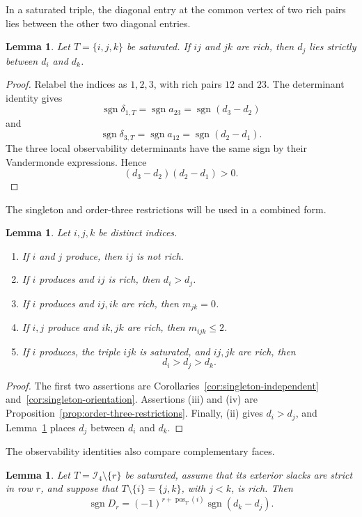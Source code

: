 \documentclass[11pt,a4paper]{article}
\newtheorem{lemma}[theorem]{Lemma}
\theoremstyle{definition}
\newcommand{\Ind}{\mathcal I}
\DeclareMathOperator{\sgn}{sgn}
\begin{document}
In a saturated triple, the diagonal entry at the common vertex of two
rich pairs lies between the other two diagonal entries.

\begin{lemma}
\label{lem:rich-path-median}
Let $T=\{i,j,k\}$ be saturated. If $ij$ and $jk$ are rich, then $d_j$
lies strictly between $d_i$ and $d_k$.
\end{lemma}

\begin{proof}
Relabel the indices as $1,2,3$, with rich pairs $12$ and $23$. The
determinant identity gives
$$
\sgn\delta_{1,T}
=
\sgn a_{23}
=
\sgn(d_3-d_2)
$$
and
$$
\sgn\delta_{3,T}
=
\sgn a_{12}
=
\sgn(d_2-d_1).
$$
The three local observability determinants have the same sign by their
Vandermonde expressions. Hence
$$
(d_3-d_2)(d_2-d_1)>0.
$$
\end{proof}

The singleton and order-three restrictions will be used in a combined
form.

\begin{lemma}
\label{lem:singleton-rich-rules}
Let $i,j,k$ be distinct indices.

\begin{enumerate}[label=\textup{(\roman*)}]
\item If $i$ and $j$ produce, then $ij$ is not rich.
\item If $i$ produces and $ij$ is rich, then $d_i>d_j$.
\item If $i$ produces and $ij,ik$ are rich, then $m_{jk}=0$.
\item If $i,j$ produce and $ik,jk$ are rich, then $m_{ijk}\leq2$.
\item If $i$ produces, the triple $ijk$ is saturated, and $ij,jk$ are
rich, then
$$
d_i>d_j>d_k.
$$
\end{enumerate}
\end{lemma}

\begin{proof}
The first two assertions are
Corollaries~\ref{cor:singleton-independent}
and~\ref{cor:singleton-orientation}. Assertions \textup{(iii)} and
\textup{(iv)} are Proposition~\ref{prop:order-three-restrictions}.
Finally, \textup{(ii)} gives $d_i>d_j$, and
Lemma~\ref{lem:rich-path-median} places $d_j$ between $d_i$ and $d_k$.
\end{proof}

The observability identities also compare complementary faces.

\begin{lemma}
\label{lem:D-gluing}
Let $T=\Ind_4\setminus\{r\}$ be saturated, assume that its exterior
slacks are strict in row $r$, and suppose that
$T\setminus\{i\}=\{j,k\}$, with $j<k$, is rich. Then
$$
\sgn D_r
=
(-1)^{r+\operatorname{pos}_T(i)}
\sgn(d_k-d_j).
$$
\end{lemma}
\end{document}
